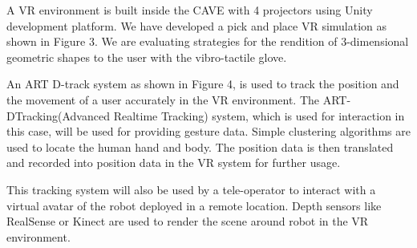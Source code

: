A VR environment is built inside the CAVE with 4 projectors using
Unity development platform. We have developed a pick and place VR
simulation as shown in Figure 3. We are evaluating strategies for the
rendition of 3-dimensional geometric shapes to the user with the
vibro-tactile glove.

An ART D-track system as shown in Figure 4, is used to track the position and the movement of a user accurately in the VR environment. The ART-DTracking(Advanced Realtime Tracking) system, which is used for interaction in this case, will be used for providing gesture data. Simple clustering algorithms are used to locate the human hand and body. The position data is then translated and recorded into position data in the VR system for further usage. 


This tracking system will also be used by a tele-operator to interact
with a virtual avatar of the robot deployed in a remote
location. Depth sensors like RealSense or Kinect are used to render
the scene around robot in the VR environment.

